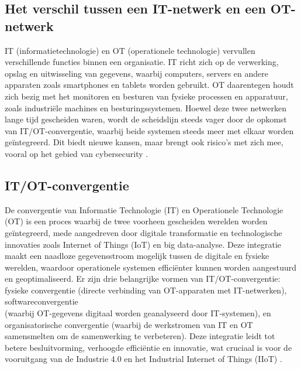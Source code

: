 \subsection{Het verschil tussen een IT-netwerk en een OT-netwerk}
IT (informatietechnologie) en OT (operationele technologie) vervullen verschillende functies binnen een organisatie. IT richt zich op de verwerking, opslag en 
uitwisseling van gegevens, waarbij computers, servers en andere apparaten zoals smartphones en tablets worden gebruikt. OT daarentegen houdt zich bezig met het 
monitoren en besturen van fysieke processen en apparatuur, zoals industriële machines en besturingssystemen. Hoewel deze twee netwerken lange tijd gescheiden waren, 
wordt de scheidslijn steeds vager door de opkomst van IT/OT-convergentie, waarbij beide systemen steeds meer met elkaar worden geïntegreerd. Dit biedt nieuwe kansen, 
maar brengt ook risico’s met zich mee, vooral op het gebied van cybersecurity \autocite{onlogic2023}.

\subsection{IT/OT-convergentie}
De convergentie van Informatie Technologie (IT) en Operationele Technologie (OT) is een proces waarbij de twee voorheen gescheiden werelden worden geïntegreerd, mede aangedreven door digitale 
transformatie en technologische innovaties zoals Internet of Things (IoT) en big data-analyse. Deze integratie maakt een naadloze gegevensstroom mogelijk tussen de digitale en fysieke werelden, 
waardoor operationele systemen efficiënter kunnen worden aangestuurd en geoptimaliseerd. Er zijn drie belangrijke vormen van IT/OT-convergentie: fysieke convergentie (directe verbinding van OT-apparaten met IT-netwerken), 
softwareconvergentie \\(waarbij OT-gegevens digitaal worden geanalyseerd door IT-systemen), en organisatorische convergentie (waarbij de werkstromen van IT en OT samensmelten om de samenwerking te verbeteren). Deze integratie 
leidt tot betere besluitvorming, verhoogde efficiëntie en innovatie, wat cruciaal is voor de vooruitgang van de Industrie 4.0 en het Industrial Internet of Things (IIoT) \autocite{maleh2021ot,paloaltonetworks2023}.

